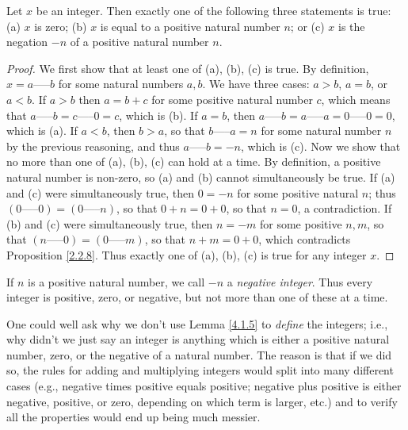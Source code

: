 \begin{lemma}\label{4.1.5}
Let \(x\) be an integer.
Then exactly one of the following three statements is true:
(a) \(x\) is zero;
(b) \(x\) is equal to a positive natural number \(n\);
or (c) \(x\) is the negation \(-n\) of a positive natural number \(n\).
\end{lemma}

\begin{proof}
We first show that at least one of (a), (b), (c) is true.
By definition, \(x = a \text{-----} b\) for some natural numbers \(a, b\).
We have three cases: \(a > b\), \(a = b\), or \(a < b\).
If \(a > b\) then \(a = b + c\) for some positive natural number \(c\), which means that \(a \text{-----} b = c \text{-----} 0 = c\), which is (b).
If \(a = b\), then \(a \text{-----} b = a \text{-----} a = 0 \text{-----} 0 = 0\), which is (a).
If \(a < b\), then \(b > a\), so that \(b \text{-----} a = n\) for some natural number \(n\) by the previous reasoning, and thus \(a \text{-----} b = -n\), which is (c).
Now we show that no more than one of (a), (b), (c) can hold at a time.
By definition, a positive natural number is non-zero, so (a) and (b) cannot simultaneously be true.
If (a) and (c) were simultaneously true, then \(0 = -n\) for some positive natural \(n\);
thus \((0 \text{-----} 0) = (0 \text{-----} n)\), so that \(0 + n = 0 + 0\), so that \(n = 0\), a contradiction.
If (b) and (c) were simultaneously true, then \(n = -m\) for some positive \(n, m\), so that \((n \text{-----} 0) = (0 \text{-----} m)\), so that \(n + m = 0 + 0\), which contradicts Proposition \ref{2.2.8}.
Thus exactly one of (a), (b), (c) is true for any integer \(x\).
\end{proof}

\begin{note}
If \(n\) is a positive natural number, we call \(-n\) a \emph{negative integer}.
Thus every integer is positive, zero, or negative, but not more than one of these at a time.
\end{note}

\begin{note}
One could well ask why we don’t use Lemma \ref{4.1.5} to \emph{define} the integers;
i.e., why didn’t we just say an integer is anything which is either a positive natural number, zero, or the negative of a natural number.
The reason is that if we did so, the rules for adding and multiplying integers would split into many different cases (e.g., negative times positive equals positive; negative plus positive is either negative, positive, or zero, depending on which term is larger, etc.) and to verify all the properties would end up being much messier.
\end{note}

